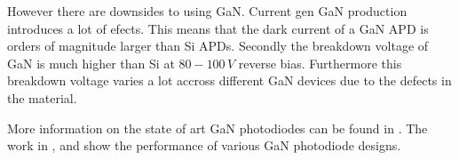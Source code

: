However there are downsides to using GaN. Current gen GaN production introduces a lot of efects. This means that the dark current of a GaN APD is orders of magnitude larger than Si APDs. Secondly the breakdown voltage of GaN is much higher than Si at $80-100\,V$ reverse bias. Furthermore this breakdown voltage varies a lot accross different GaN devices due to the defects in the material.

More information on the state of art GaN photodiodes can be found in \cite{nikzad2016single}. The work in \cite{choi2009geiger}, \cite{verghese2001gan} and \cite{carrano2000gan} show the performance of various GaN photodiode designs. 
